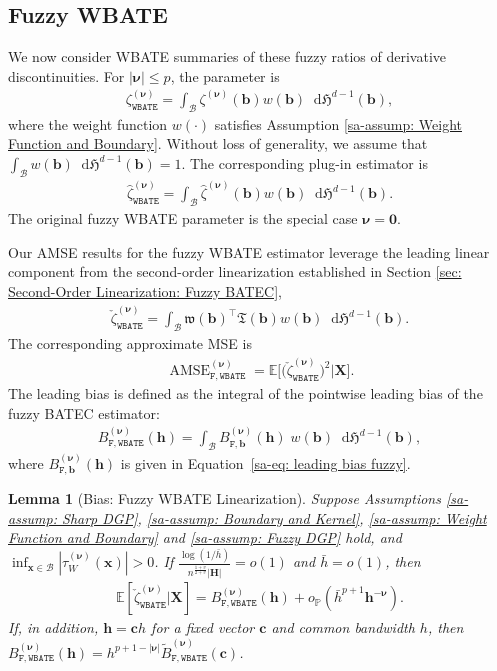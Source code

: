 \documentclass[10pt]{article}
\newtheorem{lem}{Lemma}
\renewcommand{\P}{\mathbb{P}}
\newcommand{\E}{\mathbb{E}}
\newcommand{\Haus}{\mathfrak{H}}
\newcommand{\dif}{\mathop{}\!\mathrm{d}}
\newcommand{\bb}{\mathbf{b}}
\newcommand{\bc}{\mathbf{c}}
\newcommand{\bh}{\mathbf{h}}
\newcommand{\bH}{\mathbf{H}}
\newcommand{\bx}{\mathbf{x}}
\newcommand{\bX}{\mathbf{X}}
\newcommand{\bnu}{\boldsymbol{\nu}}
\newcommand{\B}{\mathcal{B}}
\begin{document}
\subsection{Fuzzy WBATE}

We now consider WBATE summaries of these fuzzy ratios of derivative discontinuities. For $|\bnu|\le p$, the parameter is
\begin{align*}
    \zeta_{\mathtt{WBATE}}^{(\bnu)} = \int_{\B} \zeta^{(\bnu)}(\bb) w(\bb) \dif\Haus^{d-1} (\bb),
\end{align*}
where the weight function $w(\cdot)$ satisfies Assumption \ref{sa-assump: Weight Function and Boundary}. Without loss of generality, we assume that $\int_{\B} w(\bb) \dif\Haus^{d-1} (\bb) = 1$. The corresponding plug-in estimator is
\begin{align*}
    \widehat{\zeta}_{\mathtt{WBATE}}^{(\bnu)} = \int_\B \widehat{\zeta}^{(\bnu)}(\bb) w(\bb) \dif\Haus^{d-1}(\bb).
\end{align*}
The original fuzzy WBATE parameter is the special case $\bnu=\mathbf{0}$.

Our AMSE results for the fuzzy WBATE estimator leverage the leading linear component from the second-order linearization established in Section \ref{sec: Second-Order Linearization: Fuzzy BATEC},
\begin{align*}
    \check{\zeta}_{\mathtt{WBATE}}^{(\bnu)}
    = \int_{\B}\mathfrak{w}(\bb)^\top\mathfrak{T}(\bb) w(\bb) \dif\Haus^{d-1}(\bb).
\end{align*}
The corresponding approximate MSE is
\begin{align*}
    \operatorname{AMSE}_{\mathtt{F,WBATE}}^{(\bnu)}
    = \E\big[\big(\check{\zeta}_{\mathtt{WBATE}}^{(\bnu)}\big)^2\big|\bX\big].
\end{align*}
The leading bias is defined as the integral of the pointwise leading bias of the fuzzy BATEC estimator:
\begin{align*}
    B_{\mathtt{F,WBATE}}^{(\bnu)}(\bh) = \int_{\B} B_{\mathtt{F},\bb}^{(\bnu)}(\bh) \; w(\bb) \dif\Haus^{d-1}(\bb),
\end{align*}
where $B_{\mathtt{F},\bb}^{(\bnu)}(\bh)$ is given in Equation~\eqref{sa-eq: leading bias fuzzy}.

\begin{lem}[Bias: Fuzzy WBATE Linearization]\label{sa-lem: Fuzzy Integral: Bias}
    Suppose Assumptions \ref{sa-assump: Sharp DGP}, \ref{sa-assump: Boundary and Kernel}, \ref{sa-assump: Weight Function and Boundary} and \ref{sa-assump: Fuzzy DGP} hold, and $\inf_{\bx\in\B}|\tau_W^{(\bnu)}(\bx)|>0$. If $\frac{\log(1/\bar{h})}{n^{\frac{1+v}{2+v}}|\bH|} = o(1)$ and $\bar{h} = o(1)$, then
    \begin{align*}
        \E[\check{\zeta}_{\mathtt{WBATE}}^{(\bnu)}|\bX] = B_{\mathtt{F,WBATE}}^{(\bnu)}(\bh) + o_{\P}(\bar{h}^{p+1}\bh^{-\bnu}).
    \end{align*}
    If, in addition, $\bh=\bc h$ for a fixed vector $\bc$ and common bandwidth $h$, then $B_{\mathtt{F,WBATE}}^{(\bnu)}(\bh)=h^{p+1-|\bnu|}\widetilde B_{\mathtt{F,WBATE}}^{(\bnu)}(\bc)$.
\end{lem}
\end{document}
